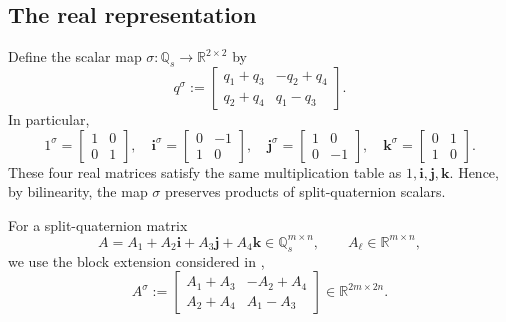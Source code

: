 \documentclass[12pt,a4paper]{article}
\theoremstyle{plain}
\theoremstyle{definition}
\theoremstyle{remark}
\begin{document}
\subsection{The real representation}
Define the scalar map \(\sigma:\mathbb{Q}_s\to\mathbb{R}^{2\times2}\) by
\begin{equation}\label{eq:sigma_scalar}
    q^\sigma :=
    \begin{bmatrix}
    q_1+q_3 & -q_2+q_4\\
    q_2+q_4 & q_1-q_3
    \end{bmatrix}.
\end{equation}
In particular,
\[
    1^\sigma=\begin{bmatrix}1&0\\0&1\end{bmatrix},\quad \mathbf{i}^\sigma=\begin{bmatrix}0&-1\\1&0\end{bmatrix},\quad \mathbf{j}^\sigma=\begin{bmatrix}1&0\\0&-1\end{bmatrix},\quad \mathbf{k}^\sigma=\begin{bmatrix}0&1\\1&0\end{bmatrix}.
\]
These four real matrices satisfy the same multiplication table as \(1,\mathbf{i},\mathbf{j},\mathbf{k}\). Hence, by bilinearity, the map \(\sigma\) preserves products of split-quaternion scalars.

For a split-quaternion matrix
\[
    A=A_1+A_2\mathbf{i}+A_3\mathbf{j}+A_4\mathbf{k} \in\mathbb{Q}_s^{m\times n}, \qquad A_\ell\in\mathbb{R}^{m\times n},
\]
we use the block extension considered in \cite{wang2024singular},
\begin{equation}\label{eq:sigma_matrix}
    A^\sigma := 
    \begin{bmatrix}
    A_1+A_3 & -A_2+A_4\\
    A_2+A_4 & A_1-A_3
    \end{bmatrix} \in\mathbb{R}^{2m\times2n}.
\end{equation}
\end{document}
